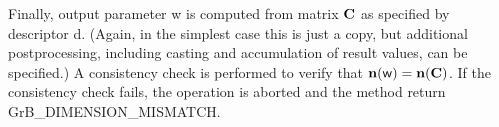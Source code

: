 Finally, output parameter {\sf w} is computed from matrix ${\bf C}$
as specified by descriptor {\sf d}. (Again, in the simplest case this
is just a copy, but additional postprocessing, including casting and
accumulation of result values, can be specified.)  A consistency check is
performed to verify that $\bold{n}({\sf w}) = \bold{n}({\bf C})$. If
the consistency check fails, the operation is aborted and the method
return {\sf GrB\_DIMENSION\_MISMATCH}.
